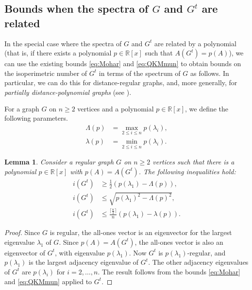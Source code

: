 \documentclass[a4paper,11pt]{article}
\newtheorem{lemma}[theorem]{Lemma}
\theoremstyle{definition}
\def\R{\mathbb R}
\begin{document}
\subsection{Bounds when the spectra of \texorpdfstring{$G$}{G} and \texorpdfstring{$G^t$}{Gt} are related}


In the special case where the spectra of $G$ and $G^t$ are related by a polynomial (that is, if there exists a polynomial $p \in \mathbb{R}[x]$ such that $A(G^t)=p(A)$), we can use the existing bounds \eqref{eq:Mohar} and \eqref{eq:QKMmun} to obtain bounds on the isoperimetric number of $G^t$ in terms of the spectrum of $G$ as follows. In particular, we can do this for distance-regular graphs, and, more generally, for \emph{partially distance-polynomial graphs} (see \cite{partially distance-polynomial}).

For a graph $G$ on $n\ge 2$ vertices and a polynomial $p\in \R[x]$, we define the following parameters.
\begin{align*}
    \Lambda(p) &= \max_{2\le i \le n} p(\lambda_i),\\
    \lambda(p) &= \min_{2\le i \le n} p(\lambda_i).
\end{align*}

\begin{lemma}\label{lemma:power}
    Consider a regular graph $G$ on $n\ge 2$ vertices such that there is a polynomial $p \in \mathbb{R}[x]$ with $p(A) = A(G^t)$. The following inequalities hold:
    \begin{align*}
    i(G^t) &\geq \frac{1}{2}( p(\lambda_1) - \Lambda(p)),\\
    i(G^t) &\le \sqrt{p(\lambda_1)^2-\Lambda(p)^2},\\
    i(G^t) &\le \frac{\lceil \frac n2 \rceil}{n}(p(\lambda_1)-\lambda(p)).
    \end{align*}
\end{lemma}
\begin{proof}
    Since $G$ is regular, the all-ones vector is an eigenvector for the largest eigenvalue $\lambda_1$ of $G$. Since $p(A)=A(G^t)$, the all-ones vector is also an eigenvector of $G^t$, with eigenvalue $p(\lambda_1)$. Now $G^t$ is $p(\lambda_1)$-regular, and $p(\lambda_1)$ is the largest adjacency eigenvalue of $G^t$. The other adjacency eigenvalues of $G^t$ are $p(\lambda_i)$ for $i=2,\dots,n$. The result follows from the bounds \eqref{eq:Mohar} and \eqref{eq:QKMmun} applied to $G^t$.
\end{proof}
\end{document}
